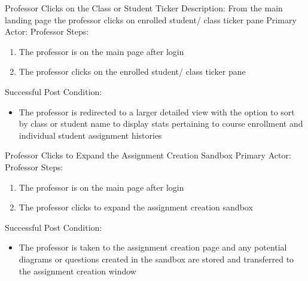    \begin{section}{Professor Clicks on the Class or Student Ticker}
        Description: From the main landing page the professor clicks on enrolled student/ class ticker pane \newline
        Primary Actor: Professor \newline
        Steps:
        \begin{enumerate}
            \item{The professor is on the main page after login}
            \item{The professor clicks on the enrolled student/ class ticker pane}
        \end{enumerate}
        Successful Post Condition:
        \begin{itemize}
            \item The professor is redirected to a larger detailed view with the option to sort by class or student name to display stats pertaining to course enrollment and individual student assignment histories
        \end{itemize}
    \end{section}
    
    \begin{section}{Professor Clicks to Expand the Assignment Creation Sandbox}
        Primary Actor: Professor \newline
        Steps:
        \begin{enumerate}
        \item{The professor is on the main page after login} 
        \item{The professor clicks to expand the assignment creation sandbox}
        \end{enumerate}
        Successful Post Condition:
        \begin{itemize}
        \item{The professor is taken to the assignment creation page and any potential diagrams or questions created in the sandbox are stored and transferred to the assignment creation window}
        \end{itemize}
    \end{section}
    
